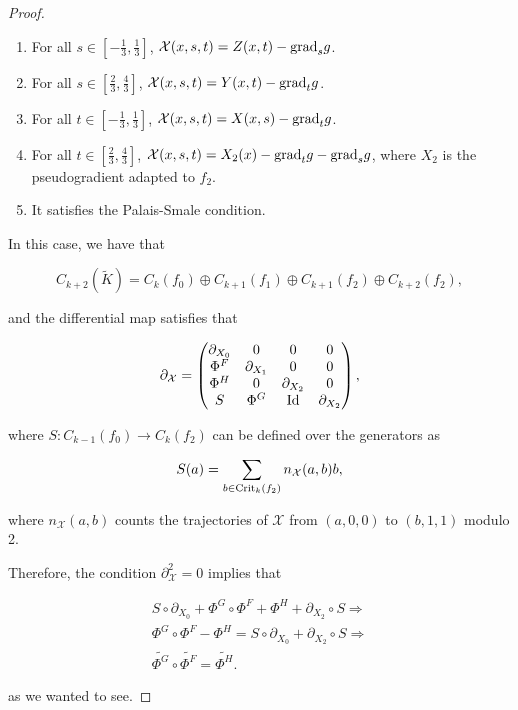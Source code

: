 \begin{proof}
\begin{enumerate}
	\item For all $s \in \left[-\frac13,\frac13\right]$, $\mathcal{X}(x,s,t) = Z(x,t) - \text{grad}_sg$.
	\item For all $s \in \left[\frac23,\frac43\right]$, $\mathcal{X}(x,s,t) = Y(x,t) - \text{grad}_tg$.
	\item For all $t \in \left[-\frac13,\frac13\right]$, $\mathcal{X}(x,s,t) = X(x,s) - \text{grad}_tg$.
	\item For all $t \in \left[\frac23,\frac43\right]$, $\mathcal{X}(x,s,t) = X_2(x) - \text{grad}_tg - \text{grad}_sg$, where $X_2$ is the pseudogradient adapted to $f_2$.
	\item It satisfies the Palais-Smale condition.
\end{enumerate}

In this case, we have that

\begin{displaymath}
C_{k+2}(\tilde{K}) = C_k(f_0) \oplus C_{k+1}(f_1) \oplus C_{k+1}(f_2) \oplus C_{k+2}(f_2) ,
\end{displaymath}

and the differential map satisfies that

\begin{displaymath}
\partial_{\mathcal{X}} = \begin{pmatrix} \partial_{X_0} & 0 & 0 & 0 \\ \Phi^F & \partial_{X_1} & 0 & 0 \\ \Phi^H & 0 & \partial_{X_2} & 0 \\ S & \Phi^G & \text{Id} & \partial_{X_2} \end{pmatrix} ,
\end{displaymath}

where $S : C_{k-1}(f_0) \longrightarrow C_k(f_2)$ can be defined over the generators as

\begin{displaymath}
S(a) = \sum_{b \in \text{Crit}_k(f_2)} n_{\mathcal{X}}(a,b) b ,
\end{displaymath}

where $n_{\mathcal{X}}(a,b)$ counts the trajectories of $\mathcal{X}$ from $(a,0,0)$ to $(b,1,1)$ modulo 2.

Therefore, the condition $\partial_{\mathcal{X}}^2 = 0$ implies that

\begin{eqnarray*}
S \circ \partial_{X_0} + \Phi^G \circ \Phi^F + \Phi^H + \partial_{X_2} \circ S \Rightarrow \\
\Phi^G \circ \Phi^F - \Phi^H = S \circ \partial_{X_0} + \partial_{X_2} \circ S \Rightarrow \\
\widetilde{\Phi^G} \circ \widetilde{\Phi^F} = \widetilde{\Phi^H} .
\end{eqnarray*}

as we wanted to see.
\end{proof}